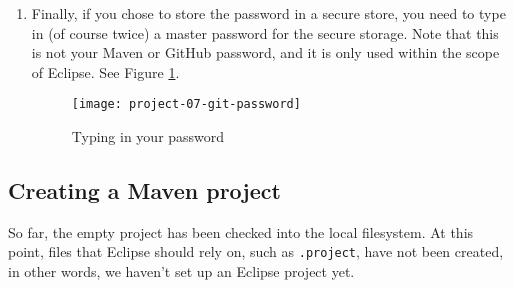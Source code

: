 \begin{enumerate}

\item Finally, if you chose to store the password in a secure store, you need to
type in (of course twice) a master password for the secure storage. Note that
this is not your Maven or GitHub password, and it is only used within the scope
of Eclipse. See Figure \ref{project-07-git-password}.

\begin{figure}[t]
\centering
\texttt{[image: project-07-git-password]}
\caption{Typing in your password\label{project-07-git-password}}
\end{figure}

\end{enumerate}

\subsection{Creating a Maven project}

So far, the empty project has been checked into the local filesystem. At this
point, files that Eclipse should rely on, such as \verb|.project|, have not been
created, in other words, we haven't set up an Eclipse project yet.

